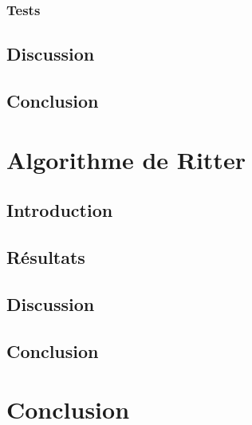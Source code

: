 \documentclass[12pt]{report}
\begin{document}
\subsection{Tests}
\section{Discussion}
\section{Conclusion}
\chapter{Algorithme de Ritter}
\section{Introduction}
\section{Résultats}
\section{Discussion}
\section{Conclusion}
\chapter{Conclusion}
\end{document}
